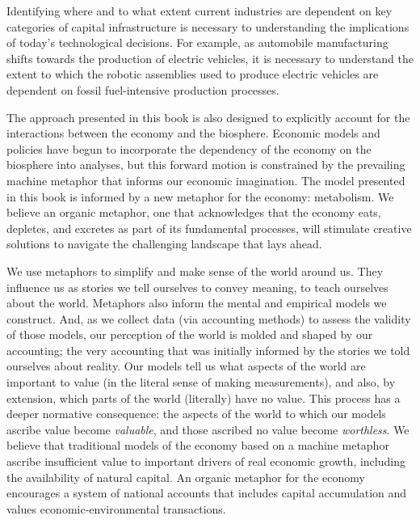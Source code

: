 Identifying where and to what extent current industries are dependent on 
key categories of capital infrastructure is necessary to understanding the
implications of today's technological decisions. For example, as 
automobile manufacturing shifts towards the production of electric vehicles,
it is necessary to understand the extent to which the robotic assemblies used
to produce electric vehicles are dependent on fossil fuel-intensive production
processes. 


The approach presented in this book is also designed to explicitly 
account for the interactions between the economy and the biosphere.
Economic models and policies have begun to
incorporate the dependency of the economy on the biosphere into 
analyses, but this forward motion is constrained 
by the prevailing machine metaphor that informs 
our economic imagination.
The model presented in this book is informed by a new metaphor for the economy: metabolism.
We believe an organic metaphor, one that acknowledges that 
the economy eats, depletes, and excretes as part of its fundamental processes, will
stimulate creative solutions to navigate the challenging landscape that lays ahead.

We use metaphors to simplify and make sense of the world around us.
They influence us as stories we tell ourselves to convey meaning,
to teach ourselves about the world.
Metaphors also inform 
the mental and empirical models we construct.
And, as we collect data (via accounting methods) 
to assess the validity of those models,
our perception of the world is molded and shaped
by our accounting;
the very accounting that was initially informed
by the stories we told ourselves about reality.
Our models tell us what aspects of the world
are important to value 
(in the literal sense of making measurements),
and also, by extension, 
which parts of the world (literally) have no value.
This process has a deeper normative consequence: 
the aspects of the world to which our models ascribe
value become \emph{valuable},
and those ascribed no value become \emph{worthless}.
We believe that traditional models of the economy
based on a machine metaphor ascribe insufficient value 
to important drivers of real economic growth,
including the availability of natural capital. An organic metaphor for 
the economy encourages a system of national accounts that includes capital accumulation
and values economic-environmental transactions.


